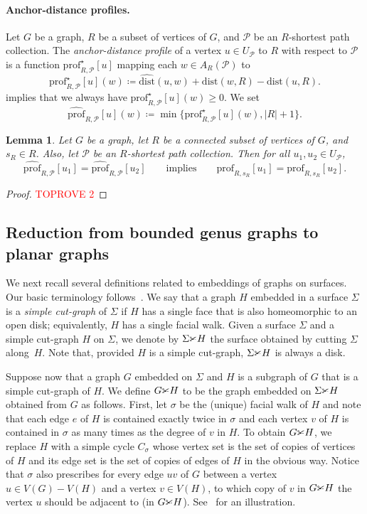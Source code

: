 \documentclass[11pt,a4paper]{article}
\newtheorem{lemma}{Lemma}[section]
\newcommand{\distprofile}[3]{\mathrm{prof}_{#1,#2}[#3]}
\newcommand{\hatprofile}[3]{\widehat{\mathrm{prof}}_{#1,#2}[#3]}
\newcommand{\diststarprofile}[3]{\mathrm{prof}^\star_{#1,#2}[#3]}
\newcommand{\dist}{\mathrm{dist}}
\renewcommand{\geq}{\geqslant}
\renewcommand{\setminus}{-}
\newcommand{\cutgraph}{\textrm{\CutLeft}}
\begin{document}
\paragraph{Anchor-distance profiles.}
Let $G$ be a graph, $R$ be a subset of vertices of $G$,  and $\mathcal{P}$
be an $R$-shortest path collection.
The \emph{anchor-distance profile} of a vertex $u\in U_{\mathcal{P}}$ to $R$ with respect to $\mathcal{P}$
is a function $\diststarprofile{R}{\mathcal{P}}{u}$ mapping each $w \in A_R(\mathcal{P})$ to
\[\diststarprofile{R}{\mathcal{P}}{u}(w) \coloneqq \widehat{\dist}(u,w) + \dist(w,R)
 - \dist(u,R).\]
 implies that we always have $\diststarprofile{R}{\mathcal{P}}{u}(w) \geq 0$.
We set
\[\hatprofile{R}{\mathcal{P}}{u}(w)\coloneqq\min\{\diststarprofile{R}{\mathcal{P}}{u}(w),|R|+1\}.\]

\begin{lemma}\label{lem:hat-to-normal}
  Let $G$ be a graph, let $R$ be a connected subset of vertices of $G$, and $s_R\in R$. Also, let $\mathcal{P}$ be an $R$-shortest path collection.
  Then for all $u_1,u_2\in U_{\mathcal{P}}$,
  $$\hatprofile{R}{\mathcal{P}}{u_1}=\hatprofile{R}{\mathcal{P}}{u_2}\qquad\textrm{implies}\qquad \distprofile{R}{s_R}{u_1}=\distprofile{R}{s_R}{u_2}.$$
\end{lemma}
\begin{proof}\textcolor{red}{TOPROVE 2}\end{proof}

\subsection{Reduction from bounded genus graphs to planar graphs}


We next recall several definitions related to embeddings of graphs on surfaces.
Our basic terminology follows~\cite{MoharT01grap}.
We say that a graph $H$ embedded in a surface $\Sigma$ is a {\em{simple cut-graph}} of $\Sigma$ if $H$ has a single face that is also homeomorphic to an open disk; equivalently, $H$ has a single facial walk.
Given a surface $\Sigma$ and a simple cut-graph $H$ on $\Sigma$, we denote by $\Sigma\cutgraph H$ the surface obtained by cutting $\Sigma$ along~$H$. Note that, provided $H$ is a simple cut-graph, $\Sigma\cutgraph H$ is always a disk.

Suppose now that a graph $G$ embedded on  $\Sigma$ and $H$ is a subgraph of $G$ that is a simple cut-graph of $H$.
We define $G\cutgraph H$ to be the graph embedded on $\Sigma\cutgraph H$ obtained from $G$ as follows.
First, let $\sigma$ be the (unique) facial walk of $H$ and note that each edge $e$ of $H$ is contained exactly twice in $\sigma$ and each vertex $v$ of $H$ is contained in $\sigma$ as many times as the degree of $v$ in $H$.
To obtain $G\cutgraph H$, we replace $H$ with a simple cycle $C_\sigma$ whose vertex set is the set of copies of vertices of $H$ and its edge set is the set of copies of edges of $H$ in the obvious way. Notice that $\sigma$ also prescribes for every edge $uv$ of $G$ between a vertex $u\in V(G)\setminus V(H)$ and a vertex $v\in V(H)$, to which copy of $v$ in $G\cutgraph H$ the vertex $u$ should be adjacent to (in $G\cutgraph H$).
See~ for an illustration.
\end{document}
